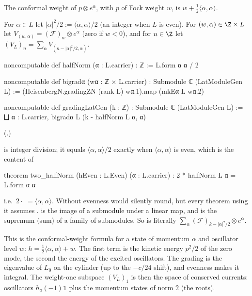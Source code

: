 The conformal weight of $p\otimes e^\alpha$, with $p$ of Fock weight $w$, is
$w+\tfrac12\langle\alpha,\alpha\rangle$.

\begin{definition}[Grading of $V_L$]\label{ch03:def:gradingLatGen}
For $\alpha\in L$ let $|\alpha|^2/2:=\langle\alpha,\alpha\rangle/2$ (an integer when $L$ is even).
For $(w,\alpha)\in\Z\times L$ let $V_{(w,\alpha)}=(\mathcal F)_w\otimes e^\alpha$ (zero if $w<0$),
and for $n\in\Z$ let $(V_L)_n=\sum_\alpha V_{(n-|\alpha|^2/2,\alpha)}$.
\end{definition}
\begin{leancode}
noncomputable def halfNorm (α : L.carrier) : ℤ := L.form α α / 2

noncomputable def bigradα (wα : ℤ × L.carrier) : Submodule ℂ (LatModuleGen L) :=
  (HeisenbergN.gradingZN (rank L) wα.1).map (mkEα L wα.2)

noncomputable def gradingLatGen (k : ℤ) : Submodule ℂ (LatModuleGen L) :=
  ⨆ α : L.carrier, bigradα L (k - halfNorm L α, α)
\end{leancode}
(.)

\begin{dictionary}
 is integer division; it equals $\langle\alpha,\alpha\rangle/2$ exactly when
$\langle\alpha,\alpha\rangle$ is even, which is the content of
\begin{leancode}
theorem two_halfNorm (hEven : L.Even) (α : L.carrier) : 2 * halfNorm L α = L.form α α
\end{leancode}
i.e.\ $2\cdot$ $=\langle\alpha,\alpha\rangle$. Without evenness  would
silently round, but every theorem using it assumes .  is the
image of a submodule under a linear map, and  is the supremum (sum) of a family of
submodules. So  is literally $\sum_\alpha(\mathcal F)_{k-|\alpha|^2/2}
\otimes e^\alpha$.
\end{dictionary}

\begin{physics}
This is the conformal-weight formula for a state of momentum $\alpha$ and oscillator level $w$: $h=\frac12\langle\alpha,\alpha\rangle+w$. The first term is the kinetic energy $p^2/2$ of the zero mode, the second the energy of the excited oscillators. The grading is the eigenvalue of $L_0$ on the cylinder (up to the $-c/24$ shift), and evenness makes it integral. The weight-one subspace $(V_L)_1$ is then the space of conserved currents: oscillators $h_a(-1)\mathbb1$ plus the momentum states of norm $2$ (the roots).
\end{physics}

